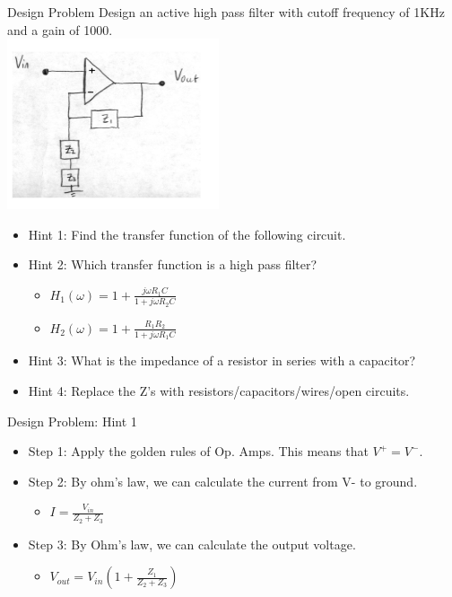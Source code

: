     \begin{frame}{Design Problem}
        Design an active high pass filter with cutoff frequency of 1KHz and a gain of 1000.\\
        \includegraphics[scale=0.65]{./images/design-problem-summary.png}\\
        \begin{itemize}
            \item Hint 1:  Find the transfer function of the following circuit.
            \item Hint 2: Which transfer function is a high pass filter?
            \begin{itemize}
                \item $H_1(\omega) = 1 + \frac{j\omega R_1C}{1 + j\omega R_2C}$
                \item $H_2(\omega) = 1 + \frac{R_1R_2}{1 + j\omega R_1C}$
            \end{itemize}
            \item Hint 3: What is the impedance of a resistor in series with a capacitor?
            \item Hint 4: Replace the Z’s with resistors/capacitors/wires/open circuits.
        \end{itemize}
    \end{frame}
    \begin{frame}{Design Problem: Hint 1}
        \begin{itemize}
            \item Step 1: Apply the golden rules of Op. Amps. This means that $V^+ = V^-$.
            \item Step 2: By ohm’s law, we can calculate the current from V- to ground.
            \begin{itemize}
                \item $I = \frac{V_{in}}{Z_2 + Z_3}$
            \end{itemize}
            \item Step 3: By Ohm’s law, we can calculate the output voltage.
            \begin{itemize}
                \item $V_{out} = V_{in}(1 + \frac{Z_1}{Z_2 + Z_3})$
            \end{itemize}
        \end{itemize}
    \end{frame}

